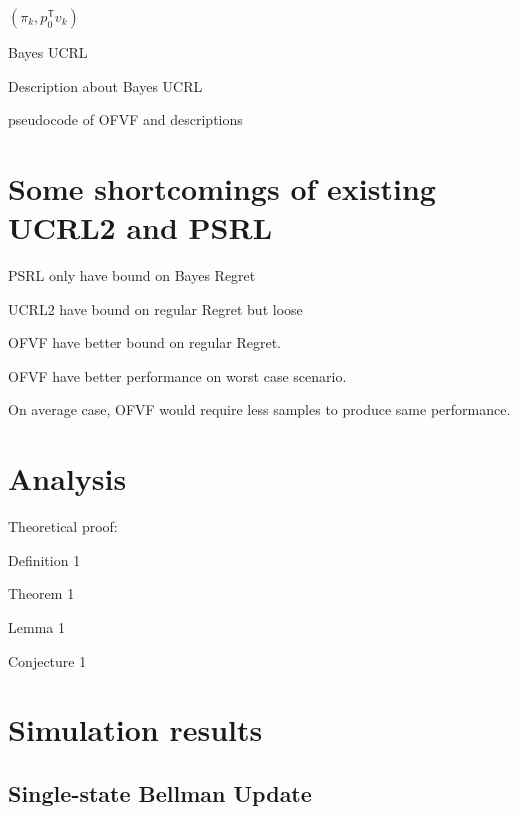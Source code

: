\documentclass{article}
\newcommand{\tr}{^{\mathsf{T}}}
\begin{document}
\begin{algorithm}[H]
	 \Return $(\pi_k, p_0\tr v_k)$ \;
	 \caption{Bayes UCRL}    \label{alg:IAVF}
\end{algorithm} 

Description about Bayes UCRL

pseudocode of OFVF and descriptions

\section{Some shortcomings of existing UCRL2 and PSRL}

PSRL only have bound on Bayes Regret

UCRL2 have bound on regular Regret but loose

OFVF have better bound on regular Regret.

OFVF have better performance on worst case scenario.

On average case, OFVF would require less samples to produce same
performance.


\section{Analysis}

Theoretical proof:

Definition 1

Theorem 1

Lemma 1

Conjecture 1

\section{Simulation results}

\subsection{Single-state Bellman Update}
\end{document}
